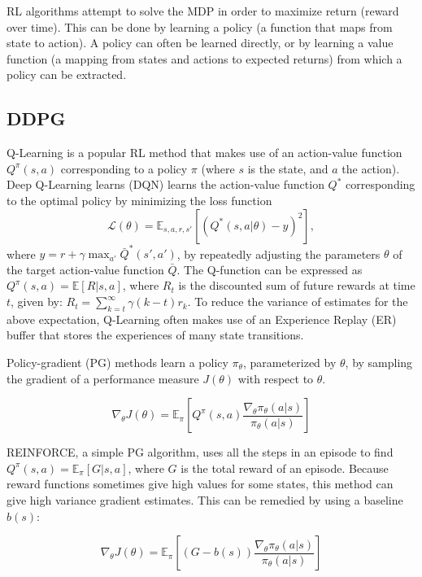 \documentclass[11pt,a4paper]{article}
\begin{document}
RL algorithms attempt to solve the MDP in order to maximize return (reward over time).
This can be done by learning a policy (a function that maps from state to action).
A policy can often be learned directly, or by learning a value function (a mapping from states and actions to expected returns) from which a policy can be extracted.

\subsection{DDPG}

Q-Learning is a popular RL method that makes use of an action-value function $Q^\pi(s, a)$ corresponding to a policy $\pi$ (where $s$ is the state, and $a$ the action).
Deep Q-Learning learns (DQN) learns the action-value function $Q^*$ corresponding to the optimal policy by minimizing the loss function
\begin{equation}
  \mathcal{L}(\theta)=\mathbb{E}_{s,a,r,s'}[(Q^*(s,a|\theta)-y)^2],
\end{equation}
where $y=r+\gamma\max_{a'}\bar{Q}^*(s',a')$,
by repeatedly adjusting the parameters $\theta$ of the target action-value function $\bar{Q}$.
The Q-function can be expressed as $Q^{\pi}(s,a)=\mathbb{E}[R|s,a]$, where $R_t$ is the discounted sum of future rewards at time $t$, given by: $R_t=\sum_{k=t}^\infty\gamma(k-t)r_k$.
To reduce the variance of estimates for the above expectation, Q-Learning often makes use of an Experience Replay (ER) buffer that stores the experiences of many state transitions.

Policy-gradient (PG) methods learn a policy $\pi_\theta$, parameterized by $\theta$,
by sampling the gradient of a performance measure $J(\theta)$ with respect to $\theta$.

\begin{equation}
  \nabla_\theta J(\theta)=\mathbb{E}_\pi\left[Q^\pi(s, a) \frac{\nabla_\theta\pi_\theta(a|s)}{\pi_\theta(a|s)}\right]
\end{equation}

REINFORCE, a simple PG algorithm, uses all the steps in an episode to find $Q^\pi(s,a)=\mathbb{E}_\pi[G|s,a]$, where $G$ is the total reward of an episode.
Because reward functions sometimes give high values for some states, this method can give high variance gradient estimates.
This can be remedied by using a baseline $b(s)$:

\begin{equation}
  \nabla_\theta J(\theta)=\mathbb{E}_\pi\left[(G-b(s)) \frac{\nabla_\theta\pi_\theta(a|s)}{\pi_\theta(a|s)}\right]
\end{equation}
\end{document}
